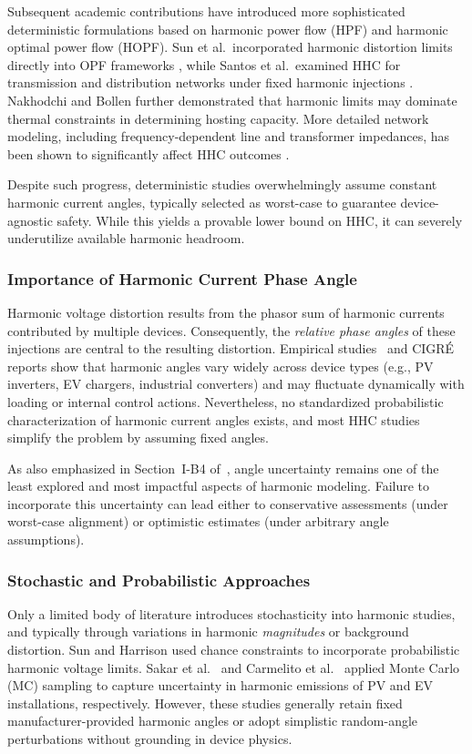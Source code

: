 Subsequent academic contributions have introduced more sophisticated deterministic formulations based on harmonic power flow (HPF) and harmonic optimal power flow (HOPF). Sun et al.\ incorporated harmonic distortion limits directly into OPF frameworks \cite{sun2012distribution, sun2012incorporating}, while Santos et al.\ examined HHC for transmission and distribution networks under fixed harmonic injections \cite{santos2015considerations}. Nakhodchi and Bollen \cite{nakhodchi2023impact} further demonstrated that harmonic limits may dominate thermal constraints in determining hosting capacity. More detailed network modeling, including frequency-dependent line and transformer impedances, has been shown to significantly affect HHC outcomes \cite{vanacker2025impact, geth2022harmonic}.

Despite such progress, deterministic studies overwhelmingly assume constant harmonic current angles, typically selected as worst-case to guarantee device-agnostic safety. While this yields a provable lower bound on HHC, it can severely underutilize available harmonic headroom.

\subsubsection{Importance of Harmonic Current Phase Angle}
Harmonic voltage distortion results from the phasor sum of harmonic currents contributed by multiple devices. Consequently, the \emph{relative phase angles} of these injections are central to the resulting distortion. Empirical studies~\cite{bollen2017hosting} and CIGRÉ reports show that harmonic angles vary widely across device types (e.g., PV inverters, EV chargers, industrial converters) and may fluctuate dynamically with loading or internal control actions. Nevertheless, no standardized probabilistic characterization of harmonic current angles exists, and most HHC studies simplify the problem by assuming fixed angles.

As also emphasized in Section~I-B4 of~\cite{vanacker2025impact}, angle uncertainty remains one of the least explored and most impactful aspects of harmonic modeling. Failure to incorporate this uncertainty can lead either to conservative assessments (under worst-case alignment) or optimistic estimates (under arbitrary angle assumptions).

\subsubsection{Stochastic and Probabilistic Approaches}
Only a limited body of literature introduces stochasticity into harmonic studies, and typically through variations in harmonic \emph{magnitudes} or background distortion. Sun and Harrison \cite{sun2022distribution} used chance constraints to incorporate probabilistic harmonic voltage limits. Sakar et al.\ \cite{sakar2018integration} and Carmelito et al.\ \cite{carmelito2023hosting} applied Monte Carlo (MC) sampling to capture uncertainty in harmonic emissions of PV and EV installations, respectively. However, these studies generally retain fixed manufacturer-provided harmonic angles or adopt simplistic random-angle perturbations without grounding in device physics.


